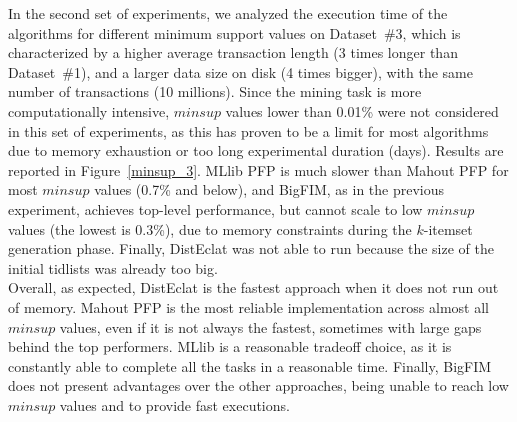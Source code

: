 \documentclass[preprint,review,12pt]{elsarticle}
\begin{document}
In the second set of experiments, we analyzed the execution time of
the algorithms for different minimum support values on Dataset~\#3,
which is characterized by a higher average transaction length
(3 times longer than Dataset~\#1),
and a larger data size on disk (4 times bigger),
with the same number of transactions (10 millions).
Since the mining task is more computationally intensive,
$minsup$ values lower than 0.01\% were
not considered in this set of experiments,
as this has proven to be a limit for most algorithms
due to memory exhaustion or too long experimental duration (days).
Results are reported in Figure~\ref{minsup_3}.
MLlib PFP is much slower than Mahout PFP for most $minsup$ values (0.7\% and below),
and BigFIM, as in the previous experiment,
achieves top-level performance, but cannot scale to low $minsup$ values
(the lowest is 0.3\%),
due to memory constraints during the $k$-itemset generation phase. Finally, DistEclat was not able to run because the size of the initial tidlists was already too big.\\
Overall, as expected,
DistEclat is the fastest approach when it does not run out of memory.
Mahout PFP is the most reliable implementation across almost all $minsup$ values,
even if it is not always the fastest,
sometimes with large gaps behind the top performers.
MLlib is a reasonable tradeoff choice,
as it is constantly able to complete all the tasks in a reasonable time.
Finally, BigFIM does not present advantages over the other approaches,
being unable to reach low $minsup$ values and to provide fast executions. \\
\end{document}
